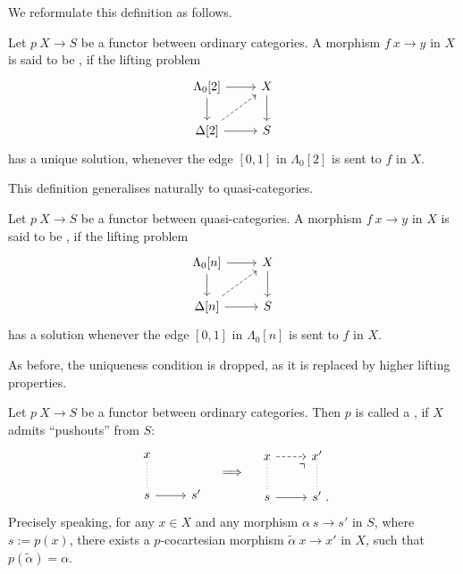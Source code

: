 We reformulate this definition as follows.

\begin{definition}
    Let $p\:X\to S$ be a functor between ordinary categories.
    A morphism $f\:x\to y$ in $X$ is said to be ,
    if the lifting problem 
    \[\begin{tikzcd}
        \Lambda_0[2] \ar[d] \ar[r] & X \ar[d] \\
        \Delta[2] \ar[r] \ar[ur,dashed] & S
    \end{tikzcd}\]
    has a unique solution, whenever the edge $[0,1]$ in $\Lambda_0[2]$ is sent to $f$ in $X$.
\end{definition}

This definition generalises naturally to quasi-categories.

\begin{definition}
    Let $p\:X\to S$ be a functor between quasi-categories.
    A morphism $f\:x\to y$ in $X$ is said to be ,
    if the lifting problem 
    \[\begin{tikzcd}
        \Lambda_0[n] \ar[d] \ar[r] & X \ar[d] \\
        \Delta[n] \ar[r] \ar[ur,dashed] & S
    \end{tikzcd}\]
    has a solution whenever the edge $[0,1]$ in $\Lambda_0[n]$ is sent to $f$ in $X$.
\end{definition}

As before, the uniqueness condition is dropped,
as it is replaced by higher lifting properties.

\begin{definition}
    Let $p\:X\to S$ be a functor between ordinary categories.
    Then $p$ is called a , if $X$ admits ``pushouts'' from $S$:
    \[\begin{tikzcd}
        x\ar[d,dotted,dash] \\
        s \ar[r] & s'
    \end{tikzcd}\quad\Longrightarrow\quad\begin{tikzcd}
        x\ar[r,dashed]\ar[d,dotted,dash] & x'\ar[d,dotted,dash] \\
        s \ar[r]\ar[ur,phantom,end anchor=south west,very near end,"\urcorner"] & s'\rlap{\ .}
    \end{tikzcd}\]
    Precisely speaking, for any
    $x\in X$ and any morphism $\alpha\:s\to s'$ in $S$,
    where $s:=p(x)$,
    there exists a $p$-cocartesian morphism $\tilde\alpha\:x\to x'$ in $X$,
    such that $p(\tilde\alpha)=\alpha$.
\end{definition}

